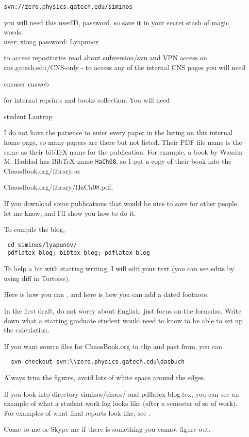 \begin{description}
\texttt{svn://zero.physics.gatech.edu/siminos}

you will
need this userID, password, so save it in your secret stash of magic
words:
\\
user: xiong  password: Lyapunov

to access repositories read about subversion/svn and VPN access on
 {cns.gatech.edu/CNS-only} - to
access any of the internal CNS pages you will need

cnsuser           cnsweb

 for internal reprints and
books collection. You will need

student           Lautrup

I do not have the patience to enter every paper in the listing on this
internal home page, so many papers are there but not listed. Their PDF
file name is the same as their bibTeX name for the publication. For
example, a book by Wassim M. Haddad has BibTeX name
\texttt{HaCh08}, so I put a copy of their book into the
ChaosBook.org/library as

{ChaosBook.org/library/HaCh08.pdf}.

If you download some publications that would be nice to save for other
people, let me know, and I'll show you how to do it.

To compile the blog,
\begin{verbatim}
 cd siminos/lyapunov/
 pdflatex blog; bibtex blog; pdflatex blog
\end{verbatim}

To help a bit with starting writing, I will
edit your text (you can see edits by using diff in Tortoise).

Here is how you can
, and here is how you can add a dated
footnote.

In the first draft, do not worry about
English, just focus on the formulas. Write
down what a starting graduate student would need to know to be able
to set up the calculation.

If you want source files for ChaosBook.org to clip and past from, you can
\begin{verbatim}
  svn checkout svn:\\zero.physics.gatech.edu\dasbuch
\end{verbatim}

Always trim the figures, avoid lots of white
space around the edges.

If you look into directory
siminos/chaos/ and pdflatex blog.tex, you can see an example of what
a student work log looks like (after a semester of so of work).
For examples of
what final reports look like, see .


Come to me or Skype me if there is something you
cannot figure out.

\end{description}


